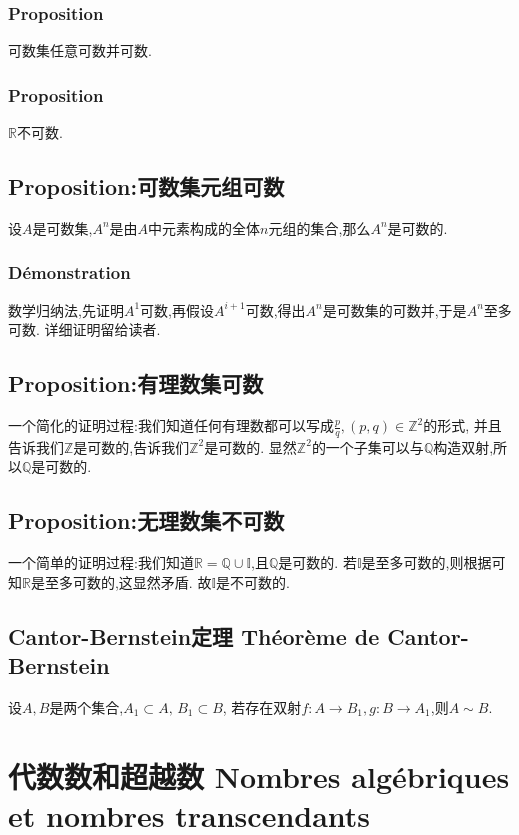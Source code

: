 \documentclass[12pt, a4paper, oneside]{ctexbook}
\newcommand{\R }{\mathbb{R}}%
\newcommand{\n }{$n$}\newcommand{\f  }{$ f $}
\begin{document}
  \subsubsection{Proposition}
  可数集任意可数并可数.
  \subsubsection{Proposition}
  $\R$不可数.
  \subsection{Proposition:可数集元组可数}\label{myref:Rnkeshu}
  设$A$是可数集,$A^n$是由$A$中元素构成的全体\n 元组的集合,那么$A^n$是可数的.
  \subsubsection{Démonstration}
  数学归纳法,先证明$A^1$可数,再假设$A^{i+1}$可数,得出$A^n$是可数集的可数并,于是$A^n$至多可数.
  详细证明留给读者.
  \subsection{Proposition:有理数集可数}
  一个简化的证明过程:我们知道任何有理数都可以写成$\frac{p}{q},(p,q)\in\mathbb{Z}^2$的形式,
  并且告诉我们$\mathbb{Z}$是可数的,告诉我们$\mathbb{Z}^2$是可数的.
  显然$\mathbb{Z}^2$的一个子集可以与$\mathbb{Q}$构造双射,所以$\mathbb{Q}$是可数的.

  \subsection{Proposition:无理数集不可数}
  一个简单的证明过程:我们知道$\R=\mathbb{Q}\cup\mathbb{I}$,且$\mathbb{Q}$是可数的.
  若$\mathbb{I}$是至多可数的,则根据可知$\R$是至多可数的,这显然矛盾.
  故$\mathbb{I}$是不可数的.
  
  \subsection{Cantor-Bernstein定理 Théorème de Cantor-Bernstein}
  设$A,B$是两个集合,$A_1\subset A,\,B_1\subset B$,
  若存在双射$f:A\rightarrow B_1,g:B\rightarrow A_1$,则$A\sim B$.
  \section{代数数和超越数 Nombres algébriques et nombres transcendants}
\end{document}
